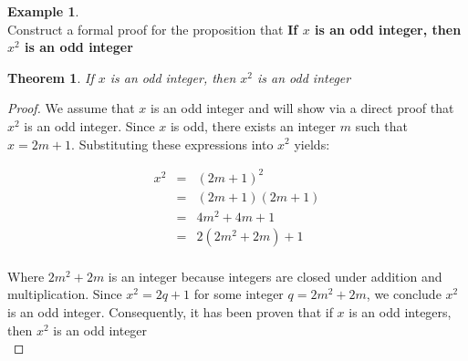 \documentclass{book}
\newtheorem{theorem}{Theorem}[section]
\theoremstyle{definition}
\newtheorem{example}{Example}[definition]
\theoremstyle{remark}
\begin{document}
\begin{example}
\cite[Chap.1, P.C.1.9, Q.4]{ted} \\

Construct a formal proof for the proposition that {\bf If $x$ is an odd integer, then $x^2$ is an odd integer}

\begin{tcolorbox}
    \begin{theorem}
        If $x$ is an odd integer, then $x^2$ is an odd integer
    \end{theorem}
\end{tcolorbox}

\begin{proof}
    We assume that $x$ is an odd integer and will show via a direct proof that $x^2$ is an odd integer. Since $x$ is odd, there exists an integer $m$ such that $x = 2m + 1$. Substituting these expressions into $x^2$ yields:
    
    \begin{eqnarray*}
        x^2 & = & (2m + 1)^2 \nonumber \\
        & = & (2m + 1)(2m + 1) \nonumber \\
        & = & 4m^2 + 4m + 1 \nonumber \\
        & = & 2(2m^2 + 2m) + 1 \nonumber \\
    \end{eqnarray*}
    
    Where $2m^2 + 2m$ is an integer because integers are closed under addition and multiplication. Since $x^2 = 2q + 1$ for some integer $q = 2m^2 + 2m$, we conclude $x^2$ is an odd integer. Consequently, it has been proven that if $x$ is an odd integers, then $x^2$ is an odd integer \\
\end{proof}
\end{example}
\end{document}
